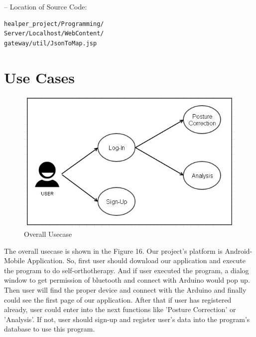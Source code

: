 \documentclass[conference]{IEEEtran}
\begin{document}
 -- Location of Source Code:

\begin{verbatim}
healper_project/Programming/
Server/Localhost/WebContent/
gateway/util/JsonToMap.jsp
\end{verbatim}




\section{Use Cases}
\begin{figure}[H]
\begin{center}
    \includegraphics[scale=0.58]{img_17.jpg}
    \caption{Overall Usecase} 
\end{center}
\end{figure}

The overall usecase is shown in the Figure 16. Our project's platform is Android-Mobile Application. So, first user should download our application and execute the program to do self-orthotherapy. And if user executed the program, a dialog window to get permission of bluetooth and connect with Arduino would pop up. Then user will find the proper device and connect with the Arduino and finally could see the first page of our application. After that if user has registered already, user could enter into the next functions like 'Posture Correction' or 'Analysis'. If not, user should sign-up and register user's data into the program's database to use this program.   
\end{document}
